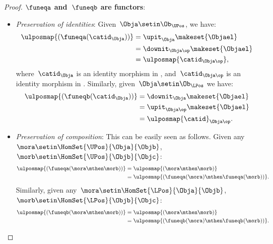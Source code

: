 \begin{proof}
    \textbf{$\funeqa$ and~$\funeqb$ are functors}:
    \begin{itemize}
        \item \emph{Preservation of identities}: Given~$\Obja\setin \Ob_{\UPos}$, we have:
              \begin{equation}
                  \begin{aligned}
                      \ulposmap{(\funeqa(\catid_\Obja))} & =\upit_\Obja\makeset{\Objael} \\
                                                         & =\downit_{\Obja\op}\makeset{\Objael} \\
                                                         & =\ulposmap{\catid_{\Obja\op}},
                  \end{aligned}
              \end{equation}
              where~$\catid_\Obja$ is an identity morphism in \UPos, and~$\catid_{\Obja\op}$ is an identity morphism in \LPos.
              Similarly, given~$\Obja\setin \Ob_{\LPos}$ we have:
              \begin{equation}
                  \begin{aligned}
                      \ulposmap{(\funeqb(\catid_\Obja))} & =\downit_\Obja\makeset{\Objael} \\
                                                         & =\upit_{\Obja\op}\makeset{\Objael} \\
                                                         & =\ulposmap{\catid}_{\Obja\op}.
                  \end{aligned}
              \end{equation}
        \item \emph{Preservation of composition}: This can be easily seen as follows.
              Given any~$\mora\setin \HomSet{\UPos}{\Obja}{\Objb}$,~$\morb\setin \HomSet{\UPos}{\Objb}{\Objc}$:
              \begin{equation}
                  \begin{aligned}
                      \ulposmap{(\funeqa(\mora \mthen \morb))} & =\ulposmap{(\mora\mthen \morb)} \\
                                                               & =\ulposmap{(\funeqa(\mora)\mthen \funeqa(\morb))}.
                  \end{aligned}
              \end{equation}
              Similarly, given any~$\mora\setin \HomSet{\LPos}{\Obja}{\Objb}$,~$\morb\setin \HomSet{\LPos}{\Objb}{\Objc}$:
              \begin{equation}
                  \begin{aligned}
                      \ulposmap{(\funeqb(\mora \mthen \morb))} & =\ulposmap{(\mora \mthen \morb)} \\
                                                               & =\ulposmap{(\funeqb(\mora)\mthen \funeqb(\morb))}.
                  \end{aligned}
              \end{equation}
    \end{itemize}


\end{proof}
